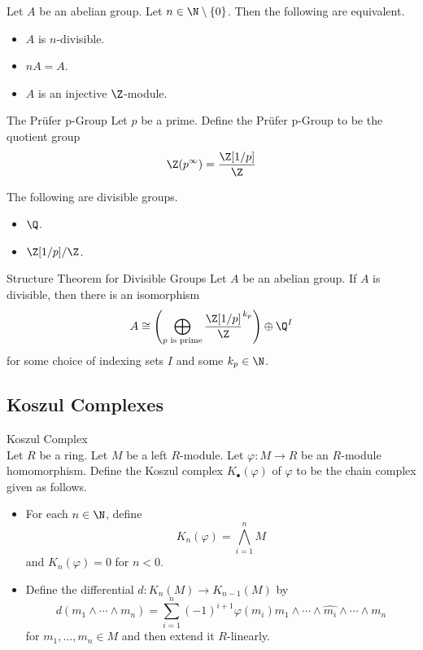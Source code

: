 \documentclass[a4paper]{article}
\begin{document}
\begin{prp}{}{} Let $A$ be an abelian group. Let $n\in\N\setminus\{0\}$. Then the following are equivalent. 
\begin{itemize}
\item $A$ is $n$-divisible. 
\item $nA=A$. 
\item $A$ is an injective $\Z$-module. 
\end{itemize}
\end{prp}

\begin{defn}{The Prüfer p-Group}{} Let $p$ be a prime. Define the Prüfer p-Group to be the quotient group $$\Z(p^\infty)=\frac{\Z[1/p]}{\Z}$$
\end{defn}

\begin{eg}{}{} The following are divisible groups. 
\begin{itemize}
\item $\Q$. 
\item $\Z[1/p]/\Z$. 
\end{itemize}
\end{eg}

\begin{thm}{Structure Theorem for Divisible Groups}{} Let $A$ be an abelian group. If $A$ is divisible, then there is an isomorphism $$A\cong\left(\bigoplus_{p\text{ is prime}}\frac{\Z[1/p]}{\Z}^{k_p}\right)\oplus\Q^I$$ for some choice of indexing sets $I$ and some $k_p\in\N$. 
\end{thm}

\subsection{Koszul Complexes}
\begin{defn}{Koszul Complex}{}\\
Let $R$ be a ring. Let $M$ be a left $R$-module. Let $\varphi:M\to R$ be an $R$-module homomorphism. Define the Koszul complex $K_\bullet(\varphi)$ of $\varphi$ to be the chain complex given as follows. 
\begin{itemize}
\item For each $n\in\N$, define $$K_n(\varphi)=\bigwedge_{i=1}^nM$$ and $K_n(\varphi)=0$ for $n<0$. 
\item Define the differential $d:K_n(M)\to K_{n-1}(M)$ by $$d(m_1\wedge\cdots\wedge m_n)=\sum_{i=1}^n(-1)^{i+1}\varphi(m_i)m_1\wedge\cdots\wedge\widehat{m_i}\wedge\cdots\wedge m_n$$ for $m_1,\dots,m_n\in M$ and then extend it $R$-linearly. 
\end{itemize}
\end{defn}
\end{document}
